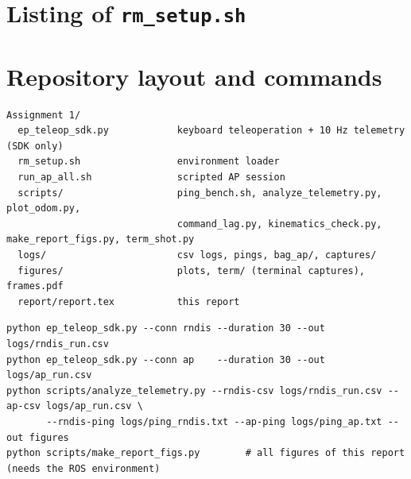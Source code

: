 \documentclass[11pt,a4paper]{article}
\begin{document}
\section{Listing of \texttt{rm\_setup.sh}}
{}

\section{Repository layout and commands}
\begin{Verbatim}[fontsize=\footnotesize]
Assignment 1/
  ep_teleop_sdk.py            keyboard teleoperation + 10 Hz telemetry (SDK only)
  rm_setup.sh                 environment loader
  run_ap_all.sh               scripted AP session
  scripts/                    ping_bench.sh, analyze_telemetry.py, plot_odom.py,
                              command_lag.py, kinematics_check.py, make_report_figs.py, term_shot.py
  logs/                       csv logs, pings, bag_ap/, captures/
  figures/                    plots, term/ (terminal captures), frames.pdf
  report/report.tex           this report
\end{Verbatim}
\begin{Verbatim}[fontsize=\footnotesize]
python ep_teleop_sdk.py --conn rndis --duration 30 --out logs/rndis_run.csv
python ep_teleop_sdk.py --conn ap    --duration 30 --out logs/ap_run.csv
python scripts/analyze_telemetry.py --rndis-csv logs/rndis_run.csv --ap-csv logs/ap_run.csv \
       --rndis-ping logs/ping_rndis.txt --ap-ping logs/ping_ap.txt --out figures
python scripts/make_report_figs.py        # all figures of this report (needs the ROS environment)
\end{Verbatim}
\end{document}
